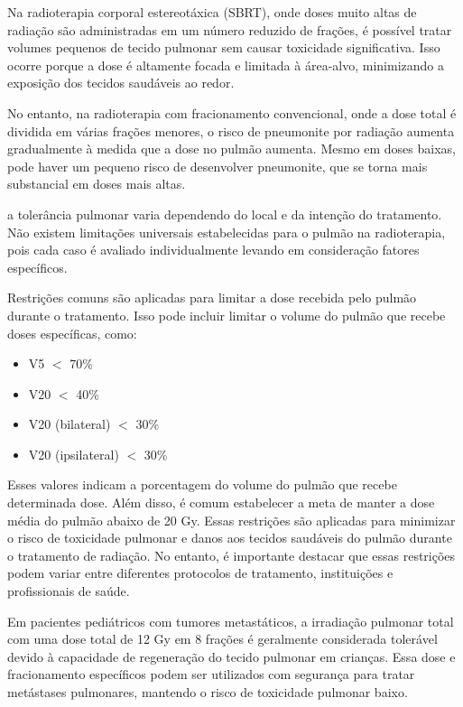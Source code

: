 \documentclass[11pt,a4paper]{article}
\begin{document}
	Na radioterapia corporal estereotáxica (SBRT), onde doses muito altas de radiação são administradas em um número reduzido de frações, é possível tratar volumes pequenos de tecido pulmonar sem causar toxicidade significativa. Isso ocorre porque a dose é altamente focada e limitada à área-alvo, minimizando a exposição dos tecidos saudáveis ao redor.

	No entanto, na radioterapia com fracionamento convencional, onde a dose total é dividida em várias frações menores, o risco de pneumonite por radiação aumenta gradualmente à medida que a dose no pulmão aumenta. Mesmo em doses baixas, pode haver um pequeno risco de desenvolver pneumonite, que se torna mais substancial em doses mais altas.

	a tolerância pulmonar varia dependendo do local e da intenção do tratamento. Não existem limitações universais estabelecidas para o pulmão na radioterapia, pois cada caso é avaliado individualmente levando em consideração fatores específicos.

	Restrições comuns são aplicadas para limitar a dose recebida pelo pulmão durante o tratamento. Isso pode incluir limitar o volume do pulmão que recebe doses específicas, como:

	\begin{itemize}
		\item V5 $<$ 70\%
		\item V20 $<$ 40\%
		\item V20 (bilateral) $<$ 30\%
		\item V20 (ipsilateral) $<$ 30\% 
	\end{itemize}

	Esses valores indicam a porcentagem do volume do pulmão que recebe determinada dose. Além disso, é comum estabelecer a meta de manter a dose média do pulmão abaixo de 20 Gy. Essas restrições são aplicadas para minimizar o risco de toxicidade pulmonar e danos aos tecidos saudáveis do pulmão durante o tratamento de radiação. No entanto, é importante destacar que essas restrições podem variar entre diferentes protocolos de tratamento, instituições e profissionais de saúde.

	Em pacientes pediátricos com tumores metastáticos, a irradiação pulmonar total com uma dose total de 12 Gy em 8 frações é geralmente considerada tolerável devido à capacidade de regeneração do tecido pulmonar em crianças. Essa dose e fracionamento específicos podem ser utilizados com segurança para tratar metástases pulmonares, mantendo o risco de toxicidade pulmonar baixo.
\end{document}
